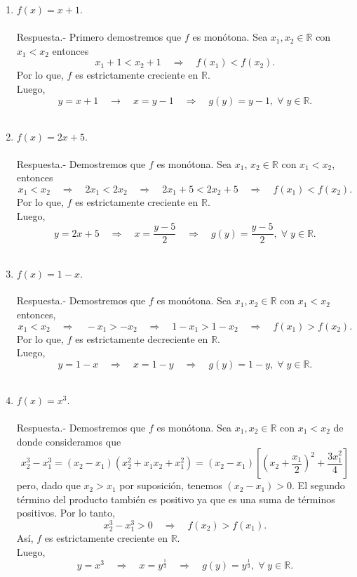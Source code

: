 \begin{enumerate}[\bfseries 1.]

    \item $f(x)=x+1$.\\\\
	Respuesta.-\; Primero demostremos que $f$ es monótona. Sea $x_1,x_2\in \mathbb{R}$ con $x_1<x_2$ entonces 
	$$x_1+1<x_2+1\quad \Rightarrow \quad f(x_1)<f(x_2).$$
	Por lo que, $f$ es estrictamente creciente en $\mathbb{R}.$\\
	Luego,
	$$y=x+1 \quad \rightarrow \quad x=y-1 \quad \Rightarrow \quad g(y)=y-1,\; \forall\; y \in \mathbb{R}.$$\\

    \item $f(x)=2x+5.$\\\\
	Respuesta.-\; Demostremos que $f$ es monótona. Sea $x_1$, $x_2\in \mathbb{R}$ con $x_1<x_2$, entonces
	$$x_1<x_2 \quad \Rightarrow \quad 2x_1<2x_2 \quad \Rightarrow \quad 2x_1+5<2x_2+5\quad \Rightarrow \quad f(x_1)<f(x_2).$$
	Por lo que, $f$ es estrictamente creciente en $\mathbb{R}.$\\
	Luego,
	$$y=2x+5\quad \Rightarrow \quad x=\dfrac{y-5}{2}\quad \Rightarrow \quad g(y)=\dfrac{y-5}{2},\; \forall \; y\in \mathbb{R}.$$\\
    \item $f(x)=1-x.$\\\\
	Respuesta.-\; Demostremos que $f$ es monótona. Sea $x_1,x_2\in \mathbb{R}$ con $x_1<x_2$ entonces,
	$$x_1<x_2 \quad \Rightarrow \quad -x_1>-x_2 \quad \Rightarrow\quad 1-x_1>1-x_2\quad \Rightarrow \quad f(x_1)>f(x_2).$$
	Por lo que, $f$ es estrictamente decreciente en $\mathbb{R}.$\\
	Luego,
	$$y=1-x\quad \Rightarrow \quad x=1-y\quad \Rightarrow \quad g(y)=1-y,\; \forall \; y\in \mathbb{R}.$$\\

    \item $f(x)=x^3.$\\\\
	Respuesta.-\; Demostremos que $f$ es monótona. Sea $x_1,x_2\in \mathbb{R}$ con $x_1<x_2$ de donde consideramos que
	$$x_2^3-x_1^3 = \left(x_2-x_1 \right)\left(x_2^2+x_1x_2+x_1^2\right) = (x_2-x_1)\left[\left(x_2+\dfrac{x_1}{2}\right)^2+\dfrac{3x_1^2}{4}\right]$$
	pero, dado que $x_2>x_1$ por suposición, tenemos $(x_2-x_1)>0$. El segundo término del producto también es positivo ya que es una suma de términos positivos. Por lo tanto,
	$$x_2^3-x_1^3>0\quad \Rightarrow \quad f(x_2)>f(x_1).$$
	Así, $f$ es estrictamente creciente en $\mathbb{R}.$\\
	Luego,
	$$y=x^3\quad \Rightarrow \quad x=y^{\frac{1}{3}} \quad \Rightarrow \quad g(y)=y^{\frac{1}{3}},\; \forall\; y\in \mathbb{R}.$$\\


\end{enumerate}
